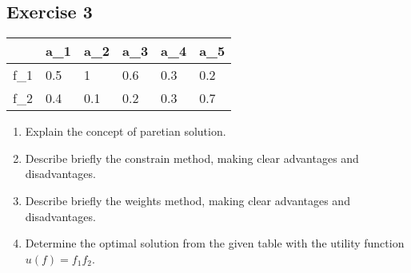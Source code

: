\documentclass[\main/main.tex]{subfiles}
\begin{document}
\subsection{Exercise 3}
\begin{table}
  \begin{tabular}{L|LLLLL}
        & a_1 & a_2 & a_3 & a_4 & a_5 \\
    \hline
    f_1 & 0.5 & 1   & 0.6 & 0.3 & 0.2 \\
    f_2 & 0.4 & 0.1 & 0.2 & 0.3 & 0.7 \\
  \end{tabular}
\end{table}
\begin{enumerate}
  \item Explain the concept of paretian solution.
  \item Describe briefly the constrain method, making clear advantages and disadvantages.
  \item Describe briefly the weights method, making clear advantages and disadvantages.
  \item Determine the optimal solution from the given table with the utility function $u(f) = f_1f_2$.
\end{enumerate}
\end{document}
